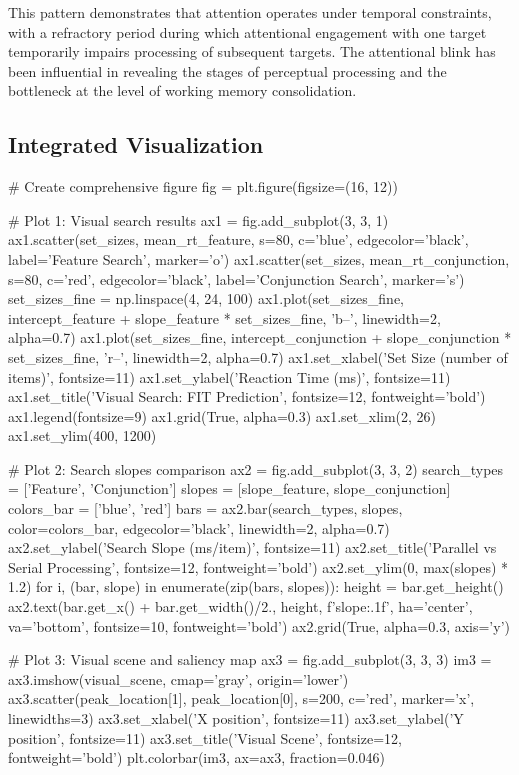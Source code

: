\documentclass[a4paper, 11pt]{article}
\begin{document}
This pattern demonstrates that attention operates under temporal constraints, with a refractory period during which attentional engagement with one target temporarily impairs processing of subsequent targets. The attentional blink has been influential in revealing the stages of perceptual processing and the bottleneck at the level of working memory consolidation.

\subsection{Integrated Visualization}

\begin{pycode}
# Create comprehensive figure
fig = plt.figure(figsize=(16, 12))

# Plot 1: Visual search results
ax1 = fig.add_subplot(3, 3, 1)
ax1.scatter(set_sizes, mean_rt_feature, s=80, c='blue', edgecolor='black',
            label='Feature Search', marker='o')
ax1.scatter(set_sizes, mean_rt_conjunction, s=80, c='red', edgecolor='black',
            label='Conjunction Search', marker='s')
set_sizes_fine = np.linspace(4, 24, 100)
ax1.plot(set_sizes_fine, intercept_feature + slope_feature * set_sizes_fine,
         'b--', linewidth=2, alpha=0.7)
ax1.plot(set_sizes_fine, intercept_conjunction + slope_conjunction * set_sizes_fine,
         'r--', linewidth=2, alpha=0.7)
ax1.set_xlabel('Set Size (number of items)', fontsize=11)
ax1.set_ylabel('Reaction Time (ms)', fontsize=11)
ax1.set_title('Visual Search: FIT Prediction', fontsize=12, fontweight='bold')
ax1.legend(fontsize=9)
ax1.grid(True, alpha=0.3)
ax1.set_xlim(2, 26)
ax1.set_ylim(400, 1200)

# Plot 2: Search slopes comparison
ax2 = fig.add_subplot(3, 3, 2)
search_types = ['Feature', 'Conjunction']
slopes = [slope_feature, slope_conjunction]
colors_bar = ['blue', 'red']
bars = ax2.bar(search_types, slopes, color=colors_bar, edgecolor='black', linewidth=2, alpha=0.7)
ax2.set_ylabel('Search Slope (ms/item)', fontsize=11)
ax2.set_title('Parallel vs Serial Processing', fontsize=12, fontweight='bold')
ax2.set_ylim(0, max(slopes) * 1.2)
for i, (bar, slope) in enumerate(zip(bars, slopes)):
    height = bar.get_height()
    ax2.text(bar.get_x() + bar.get_width()/2., height,
             f'{slope:.1f}', ha='center', va='bottom', fontsize=10, fontweight='bold')
ax2.grid(True, alpha=0.3, axis='y')

# Plot 3: Visual scene and saliency map
ax3 = fig.add_subplot(3, 3, 3)
im3 = ax3.imshow(visual_scene, cmap='gray', origin='lower')
ax3.scatter(peak_location[1], peak_location[0], s=200, c='red', marker='x', linewidths=3)
ax3.set_xlabel('X position', fontsize=11)
ax3.set_ylabel('Y position', fontsize=11)
ax3.set_title('Visual Scene', fontsize=12, fontweight='bold')
plt.colorbar(im3, ax=ax3, fraction=0.046)


\end{pycode}
\end{document}
